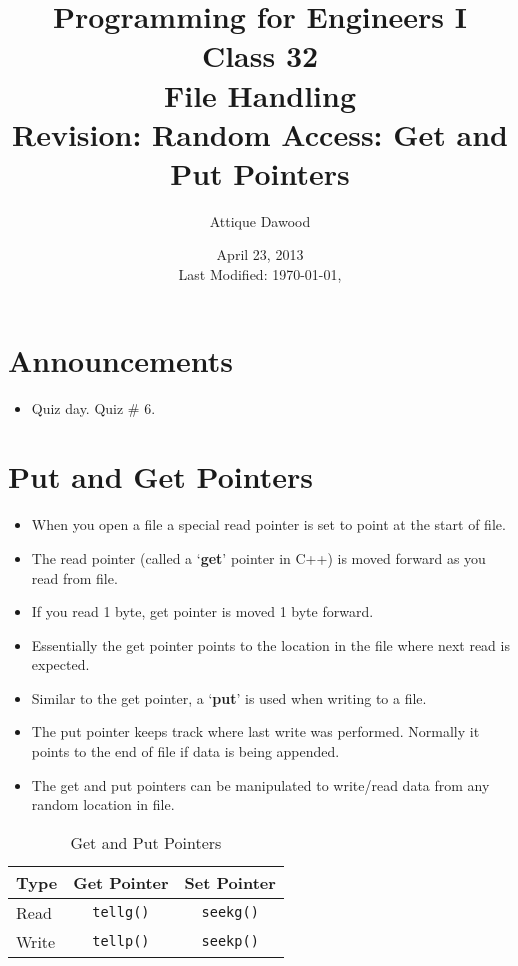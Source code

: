\documentclass[12pt,a4paper]{article}
\title{\vspace{-2cm}Programming for Engineers I\\Class 32\\File Handling\\Revision: Random Access: Get and Put Pointers}
\author{Attique Dawood}
\date{April 23, 2013\\[0.2cm] Last Modified: \today, \currenttime}
\begin{document}
\maketitle
\section{Announcements}
\begin{itemize}
\item Quiz day. Quiz \# 6.
\end{itemize}
\section{Put and Get Pointers}
\begin{itemize}
\item When you open a file a special read pointer is set to point at the start of file.
\item The read pointer (called a `\textbf{get}' pointer in C++) is moved forward as you read from file.
\item If you read 1 byte, get pointer is moved 1 byte forward.
\item Essentially the get pointer points to the location in the file where next read is expected.
\item Similar to the get pointer, a `\textbf{put}' is used when writing to a file.
\item The put pointer keeps track where last write was performed. Normally it points to the end of file if data is being appended.
\item The get and put pointers can be manipulated to write/read data from any random location in file.
\end{itemize}
\begin{table}[H]
\begin{center}
\vspace{0.3cm}
	\begin{tabular}{lcc}
	\hline \hline
		\textbf{Type} \rule{0pt}{2.6ex} & \textbf{Get Pointer} & \textbf{Set Pointer}\\
		\hline
		Read \rule{0pt}{2.6ex} &  \verb|tellg()| & \verb|seekg()|\\
		Write \rule{0pt}{2.6ex} & \verb|tellp()| & \verb|seekp()|\\
	\hline \hline
	\end{tabular}
\end{center}
\label{GetandPutPointers}
\caption{Get and Put Pointers}
\end{table}
\end{document}
